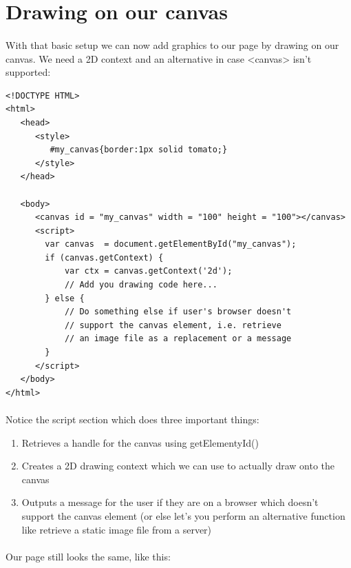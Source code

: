 \section{Drawing on our canvas}
\paragraph{} With that basic setup we can now add graphics to our page by drawing on our canvas. We need a 2D context and an alternative in case <canvas> isn’t supported:

\begin{lstlisting}
<!DOCTYPE HTML>
<html>
   <head>
      <style>
         #my_canvas{border:1px solid tomato;}
      </style>
   </head>
   
   <body>
      <canvas id = "my_canvas" width = "100" height = "100"></canvas>
      <script>
        var canvas  = document.getElementById("my_canvas");
        if (canvas.getContext) {   
            var ctx = canvas.getContext('2d');   
            // Add you drawing code here...
        } else {      
            // Do something else if user's browser doesn't
            // support the canvas element, i.e. retrieve
            // an image file as a replacement or a message
        } 
      </script>
   </body>
</html>
\end{lstlisting}

\paragraph{} Notice the script section which does three important things:

\begin{enumerate}
\item Retrieves a handle for the canvas using getElementyId()
\item Creates a 2D drawing context which we can use to actually draw onto the canvas
\item Outputs a message for the user if they are on a browser which doesn't support the canvas element (or else let's you perform an alternative function like retrieve a static image file from a server)
\end{enumerate}

\paragraph{} Our page still looks the same, like this:

